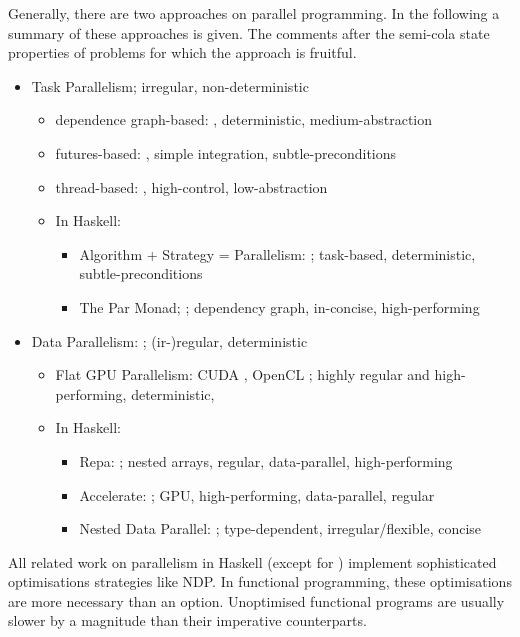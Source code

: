   Generally, there are two approaches on parallel programming.
  In the following a summary of these approaches is given. The
  comments after the semi-cola state properties of problems
  for which the approach is fruitful.
  \begin{itemize}
    \item Task Parallelism; irregular, non-deterministic
    \begin{itemize}
      \item dependence graph-based: \cite{GenTaskPar2015}, deterministic, medium-abstraction
      \item futures-based: \cite{FutPar2012}, simple integration, subtle-preconditions 
      \item thread-based: \cite{POXISthreads1997}, high-control, low-abstraction
      \item In Haskell: \cite{Marlow2012Parallel}
      \begin{itemize}
        \item Algorithm + Strategy = Parallelism: \cite{Trinder1998Algorithm}; task-based, deterministic, subtle-preconditions
        \item The Par Monad; \cite{Marlow2011Monad}; dependency graph, in-concise, high-performing
      \end{itemize}
    \end{itemize}
    \item Data Parallelism: \cite{DataParallel1986}; (ir-)regular, deterministic
    \begin{itemize}
      \item Flat GPU Parallelism: CUDA \cite{CUDA2008}, OpenCL \cite{OpenCL2010}; highly regular and high-performing, deterministic, 
      \item In Haskell: \cite{Marlow2012Parallel}
      \begin{itemize}
          \item Repa: \cite{Keller2010Regular}; nested arrays, regular, data-parallel, high-performing
          \item Accelerate: \cite{McDonell2013Optimising}; GPU, high-performing, data-parallel, regular
          \item Nested Data Parallel: \cite{Harness2008}; type-dependent, irregular/flexible, concise
      \end{itemize}
    \end{itemize}
  \end{itemize}
  All related work on parallelism in Haskell (except for \cite{Marlow2011Monad})
  implement sophisticated optimisations strategies like NDP. In
  functional programming, these optimisations are more necessary than an option.
  Unoptimised functional programs are usually slower by a magnitude than their imperative counterparts.
  
